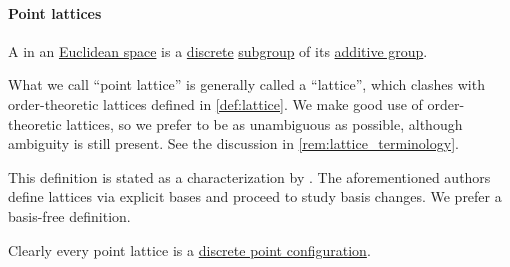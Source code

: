 \paragraph{Point lattices}

\begin{definition}\label{def:point_lattice}\mimprovised
  A  in an \hyperref[def:euclidean_space]{Euclidean space} is a \hyperref[def:discrete_set]{discrete} \hyperref[def:group/submodel]{subgroup} of its \hyperref[def:semiring]{additive group}.
\end{definition}
\begin{comments}
  \item What we call \enquote{point lattice} is generally called a \enquote{lattice}, which clashes with order-theoretic lattices defined in \cref{def:lattice}. We make good use of order-theoretic lattices, so we prefer to be as unambiguous as possible, although ambiguity is still present. See the discussion in \cref{rem:lattice_terminology}.

  \item This definition is stated as a characterization by . The aforementioned authors define lattices via explicit bases and proceed to study basis changes. We prefer a basis-free definition.

  \item Clearly every point lattice is a \hyperref[def:point_configuration]{discrete point configuration}.
\end{comments}

